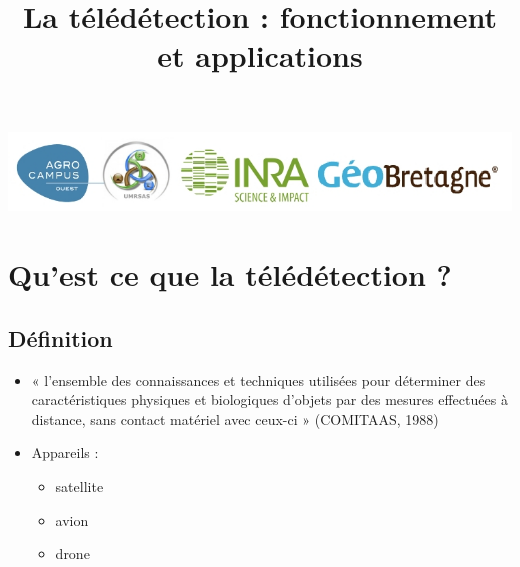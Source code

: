 \documentclass[11pt]{beamer}
\title{La télédétection : fonctionnement et applications}
\begin{document}
\begin{frame}
\titlepage
\centering
\includegraphics[scale=1]{img/logos.jpg}
\end{frame}

\begin{frame}
\tableofcontents
\end{frame}

\section{Qu'est ce que la télédétection ?}
\subsection{Définition}
\begin{frame}{}
\begin{itemize}
\item « l’ensemble des connaissances et techniques utilisées pour déterminer des caractéristiques physiques et biologiques d’objets par des mesures effectuées à distance, sans contact matériel avec ceux-ci » (COMITAAS, 1988)
\item Appareils :
\begin{itemize}
\item satellite
\item avion
\item drone
\end{itemize}
\end{itemize}
\end{frame}
\end{document}
